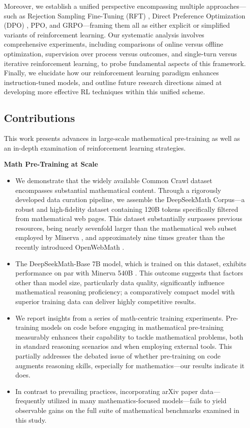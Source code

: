 Moreover, we establish a unified perspective encompassing multiple approaches—such as Rejection Sampling Fine-Tuning (RFT) \citep{yuan2023scaling}, Direct Preference Optimization (DPO) \citep{dpo}, PPO, and GRPO—framing them all as either explicit or simplified variants of reinforcement learning. Our systematic analysis involves comprehensive experiments, including comparisons of online versus offline optimization, supervision over process versus outcomes, and single-turn versus iterative reinforcement learning, to probe fundamental aspects of this framework. Finally, we elucidate how our reinforcement learning paradigm enhances instruction-tuned models, and outline future research directions aimed at developing more effective RL techniques within this unified scheme.

\subsection{Contributions}
This work presents advances in large-scale mathematical pre-training as well as an in-depth examination of reinforcement learning strategies.

\textbf{Math Pre-Training at Scale}

\begin{itemize}[topsep=0pt]
    \item We demonstrate that the widely available Common Crawl dataset encompasses substantial mathematical content. Through a rigorously developed data curation pipeline, we assemble the DeepSeekMath Corpus—a robust and high-fidelity dataset containing 120B tokens specifically filtered from mathematical web pages. This dataset substantially surpasses previous resources, being nearly sevenfold larger than the mathematical web subset employed by Minerva \citep{minerva}, and approximately nine times greater than the recently introduced OpenWebMath \citep{openwebmath}.

    \item The DeepSeekMath-Base 7B model, which is trained on this dataset, exhibits performance on par with Minerva 540B \citep{minerva}. This outcome suggests that factors other than model size, particularly data quality, significantly influence mathematical reasoning proficiency; a comparatively compact model with superior training data can deliver highly competitive results.

    \item We report insights from a series of math-centric training experiments. Pre-training models on code before engaging in mathematical pre-training measurably enhances their capability to tackle mathematical problems, both in standard reasoning scenarios and when employing external tools. This partially addresses the debated issue of whether pre-training on code augments reasoning skills, especially for mathematics—our results indicate it does.

    \item In contrast to prevailing practices, incorporating arXiv paper data—frequently utilized in many mathematics-focused models—fails to yield observable gains on the full suite of mathematical benchmarks examined in this study.
\end{itemize}

